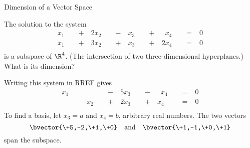 \documentclass{beamer}
\begin{document}
\begin{frame}{Dimension of a Vector Space}
\begin{example}
The solution to the system
\begin{equation*}
\begin{aligned}
x_1 &\phantom{x_1} + & 2x_2 &\phantom{x_2} - & x_3 &\phantom{x_3} + & \phantom{2}x_4 &\phantom{x_4} = & 0\\
x_1 &\phantom{x_1} + & 3x_2 &\phantom{x_2} + & x_3 &\phantom{x_3} + & 2x_4 &\phantom{x_4} = & 0\\
\end{aligned}
\end{equation*}
is a subspace of $\R^4$. (The intersection of two three-dimensional hyperplanes.) What is its dimension?
\begin{overprint}
Writing this system in RREF gives
\begin{equation*}
\begin{aligned}
x_1 &\phantom{x_1} &  &\phantom{x_2} - & 5x_3 &\phantom{x_3} - & \phantom{2}x_4 &\phantom{x_4} = & 0\\
 & & x_2 &\phantom{x_2} + & 2x_3 &\phantom{x_3} + & x_4 &\phantom{x_4} = & 0\\
\end{aligned}
\end{equation*}
To find a basis, let $x_3=a$ and $x_4=b$, arbitrary real numbers.
The two vectors
\begin{equation*}
\bvector{\+5,-2,\+1,\+0}\quad\text{and}\quad\bvector{\+1,-1,\+0,\+1}
\end{equation*}
span the subspace. 


\end{overprint}
\end{example}
\end{frame}
\end{document}
